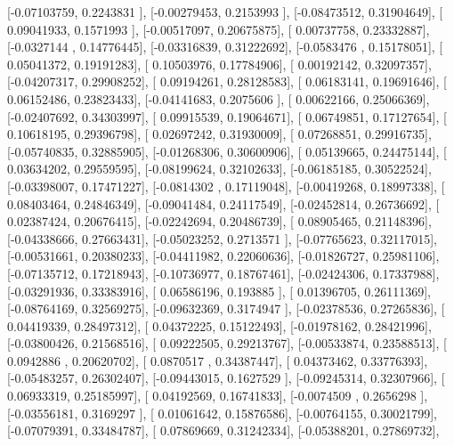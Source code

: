 \documentclass{article}
\begin{document}
       [-0.07103759,  0.2243831 ],
       [-0.00279453,  0.2153993 ],
       [-0.08473512,  0.31904649],
       [ 0.09041933,  0.1571993 ],
       [-0.00517097,  0.20675875],
       [ 0.00737758,  0.23332887],
       [-0.0327144 ,  0.14776445],
       [-0.03316839,  0.31222692],
       [-0.0583476 ,  0.15178051],
       [ 0.05041372,  0.19191283],
       [ 0.10503976,  0.17784906],
       [ 0.00192142,  0.32097357],
       [-0.04207317,  0.29908252],
       [ 0.09194261,  0.28128583],
       [ 0.06183141,  0.19691646],
       [ 0.06152486,  0.23823433],
       [-0.04141683,  0.2075606 ],
       [ 0.00622166,  0.25066369],
       [-0.02407692,  0.34303997],
       [ 0.09915539,  0.19064671],
       [ 0.06749851,  0.17127654],
       [ 0.10618195,  0.29396798],
       [ 0.02697242,  0.31930009],
       [ 0.07268851,  0.29916735],
       [-0.05740835,  0.32885905],
       [-0.01268306,  0.30600906],
       [ 0.05139665,  0.24475144],
       [ 0.03634202,  0.29559595],
       [-0.08199624,  0.32102633],
       [-0.06185185,  0.30522524],
       [-0.03398007,  0.17471227],
       [-0.0814302 ,  0.17119048],
       [-0.00419268,  0.18997338],
       [ 0.08403464,  0.24846349],
       [-0.09041484,  0.24117549],
       [-0.02452814,  0.26736692],
       [ 0.02387424,  0.20676415],
       [-0.02242694,  0.20486739],
       [ 0.08905465,  0.21148396],
       [-0.04338666,  0.27663431],
       [-0.05023252,  0.2713571 ],
       [-0.07765623,  0.32117015],
       [-0.00531661,  0.20380233],
       [-0.04411982,  0.22060636],
       [-0.01826727,  0.25981106],
       [-0.07135712,  0.17218943],
       [-0.10736977,  0.18767461],
       [-0.02424306,  0.17337988],
       [-0.03291936,  0.33383916],
       [ 0.06586196,  0.193885  ],
       [ 0.01396705,  0.26111369],
       [-0.08764169,  0.32569275],
       [-0.09632369,  0.3174947 ],
       [-0.02378536,  0.27265836],
       [ 0.04419339,  0.28497312],
       [ 0.04372225,  0.15122493],
       [-0.01978162,  0.28421996],
       [-0.03800426,  0.21568516],
       [ 0.09222505,  0.29213767],
       [-0.00533874,  0.23588513],
       [ 0.0942886 ,  0.20620702],
       [ 0.0870517 ,  0.34387447],
       [ 0.04373462,  0.33776393],
       [-0.05483257,  0.26302407],
       [-0.09443015,  0.1627529 ],
       [-0.09245314,  0.32307966],
       [ 0.06933319,  0.25185997],
       [ 0.04192569,  0.16741833],
       [-0.0074509 ,  0.2656298 ],
       [-0.03556181,  0.3169297 ],
       [ 0.01061642,  0.15876586],
       [-0.00764155,  0.30021799],
       [-0.07079391,  0.33484787],
       [ 0.07869669,  0.31242334],
       [-0.05388201,  0.27869732],
\end{document}
